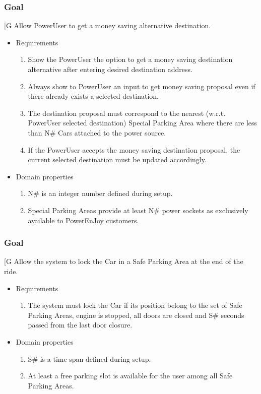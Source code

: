     \subsubsection{Goal }
    {[}G\arabic{goalctr}{]}
    Allow PowerUser to get a money saving alternative destination.
    \begin{itemize}
        \item Requirements
        \begin{enumerate}[REQ]
    			\item Show the PowerUser the option to get a money saving destination alternative after entering desired destination address.
    			\item Always show to PowerUser an input to get money saving proposal even if there already exists a selected destination.
    			\item The destination proposal must correspond to the nearest (w.r.t. PowerUser selected destination) Special Parking Area where there are less than N\# Cars attached to the power source.
    			\item If the PowerUser accepts the money saving destination proposal, the current selected destination must be updated accordingly.
        \end{enumerate}
        \item Domain properties
        \begin{enumerate}[PRO]
                \item N\# is an integer number defined during setup.
    			\item Special Parking Areas provide at least N\# power sockets as exclusively available to PowerEnJoy customers.
        \end{enumerate}
    \end{itemize}
 
    \subsubsection{Goal }
    {[}G\arabic{goalctr}{]}
    Allow the system to lock the Car in a Safe Parking Area at the end of the ride.
    \begin{itemize}
        \item Requirements
        \begin{enumerate}[REQ]
    			\item The system must lock the Car if its position belong to the set of Safe Parking Areas, engine is stopped, all doors are closed and S\# seconds passed from the last door closure.
        \end{enumerate}
        \item Domain properties
        \begin{enumerate}[PRO]
                \item S\# is a time-span defined during setup.
    			\item At least a free parking slot is available for the user among all Safe Parking Areas.
        \end{enumerate}
    \end{itemize} 
 
